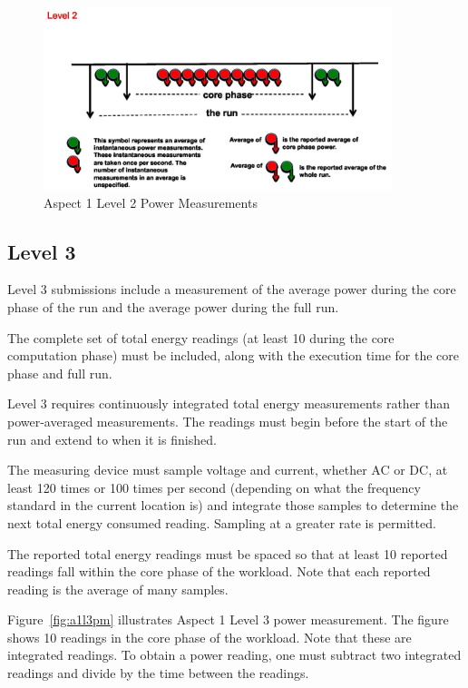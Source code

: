 \begin{figure}
\centering
\includegraphics[width=4in]{fig3-4}
\caption{Aspect 1 Level 2 Power Measurements}
\label{fig:a1l2pm}
\end{figure}

\subsection{Level 3}
\noindent
Level 3 submissions include a measurement of the average power during the core phase of the run and the average power during the full run.
\wl

\noindent
The complete set of total energy readings (at least 10 during the core computation phase) must be included, along with the execution time for the core phase and full run. 
\wl

\noindent
Level 3 requires continuously integrated total energy measurements rather than power-averaged measurements. The readings must begin before the start of the run and extend to when it is finished.
\wl

\noindent
The measuring device must sample voltage and current, whether AC or DC, at least 120 times or 100 times per second (depending on what the frequency standard in the current location is) and integrate those samples to determine the next total energy consumed reading.  Sampling at a greater rate is permitted. 
\wl

\noindent
The reported total energy readings must be spaced so that at least 10 reported readings fall within the core phase of the workload. Note that each reported reading is the average of many samples.
\wl


\noindent
Figure~\ref{fig:a1l3pm} illustrates Aspect 1 Level 3 power measurement. The figure shows 10 readings in the core phase of the workload. Note that these are integrated readings.  To obtain a power reading, one must subtract two integrated readings and divide by the time between the readings.

